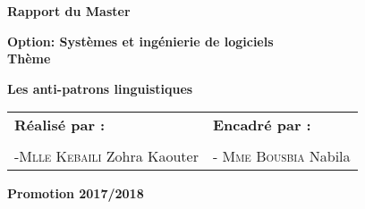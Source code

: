
\begin{titlepage}
 \begin{center}
 
 \vspace*{1cm}
  \LARGE
  \textbf{Rapport du Master\\}
  \large
 
  \LARGE
  	\vspace{2cm}
  \textbf{Option: Systèmes et ingénierie de logiciels}\\
  \vspace{1cm}
  \LARGE
  \textbf{Thème}\\
  \vspace{1cm}
  \LARGE
  \setlength{\fboxsep}{0.5cm}
  \begin{framed}
	\textbf{Les anti-patrons linguistiques}
  \end{framed}
  \vspace{2cm}
  \begin{table}[H]
   \setlength{\tabcolsep}{2cm}
    \large
	\centering
	\begin{tabular}{ll}
		\textbf{Réalisé par :}    
		 & \textbf{Encadré par : } \\  \\
		 -\textsc{Mlle Kebaili} Zohra Kaouter 
	
	& -\textsc{ Mme Bousbia} Nabila   \\
	

	\end{tabular}
  \end{table}
  \vspace{\fill}
  \large
  \textbf{Promotion 2017/2018}
        
 \end{center}
\end{titlepage}